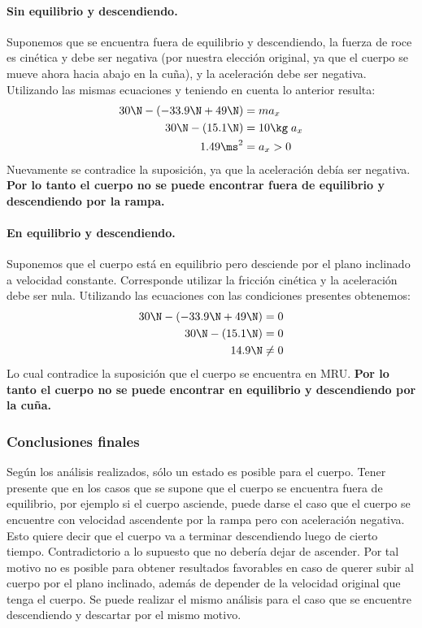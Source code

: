 \paragraph{Sin equilibrio y descendiendo.}
Suponemos que se encuentra fuera de equilibrio y descendiendo, la fuerza de
roce es cinética y debe ser negativa (por nuestra elección original, ya que el
cuerpo se mueve ahora hacia abajo en la cuña), y la aceleración debe ser
negativa.  Utilizando las mismas ecuaciones y teniendo en cuenta lo anterior
resulta:
\begin{align*}
  30\N - (-33.9\N + 49\N) &= m a_x \\
  30\N - (15.1\N) & = 10\kg\; a_x \\
  1.49\ms^2 & =  a_x > 0
\end{align*}
Nuevamente se contradice la suposición, ya que la aceleración debía ser
negativa. {\bf Por lo tanto el cuerpo no se puede encontrar fuera de equilibrio
y descendiendo por la rampa.}

\paragraph{En equilibrio y descendiendo.}
Suponemos que el cuerpo está en equilibrio pero desciende por el plano inclinado
a velocidad constante. Corresponde utilizar la fricción cinética y la
aceleración debe ser nula. Utilizando las ecuaciones con las condiciones
presentes obtenemos:
\begin{align*}
  30\N - (-33.9\N + 49\N) &= 0 \\
  30\N - (15.1\N) & = 0 \\
  14.9\N & \neq 0  
\end{align*}
Lo cual contradice la suposición que el cuerpo se encuentra en MRU. {\bf Por lo
tanto el cuerpo no se puede encontrar en equilibrio y descendiendo por la
cuña.}

\subsubsection{Conclusiones finales}

Según los análisis realizados, sólo un estado es posible para el cuerpo. Tener
presente que en los casos que se supone que el cuerpo se encuentra fuera de
equilibrio, por ejemplo si el cuerpo asciende, puede darse el caso que el cuerpo
se encuentre con velocidad ascendente por la rampa pero con aceleración negativa.
Esto quiere decir que el cuerpo va a terminar descendiendo luego de cierto
tiempo. Contradictorio a lo supuesto que no debería dejar de ascender. Por tal
motivo no es posible para obtener resultados favorables en caso de querer subir
al cuerpo por el plano inclinado, además de depender de la velocidad original
que tenga el cuerpo. Se puede realizar el mismo análisis para el caso que se
encuentre descendiendo y descartar por el mismo motivo. 

